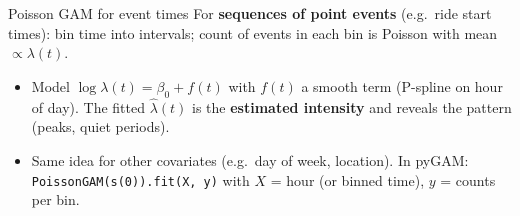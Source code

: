 \documentclass[aspectratio=169]{beamer}
\begin{document}
\begin{frame}{Poisson GAM for event times}
For \textbf{sequences of point events} (e.g.\ ride start times): bin time into intervals; count of events in each bin is Poisson with mean $\propto \lambda(t)$.

\begin{itemize}
    \item Model $\log \lambda(t) = \beta_0 + f(t)$ with $f(t)$ a smooth term (P-spline on hour of day). The fitted $\hat{\lambda}(t)$ is the \textbf{estimated intensity} and reveals the pattern (peaks, quiet periods).
    \item Same idea for other covariates (e.g.\ day of week, location). In pyGAM: \texttt{PoissonGAM(s(0)).fit(X, y)} with $X$ = hour (or binned time), $y$ = counts per bin.
\end{itemize}
\end{frame}
\end{document}
